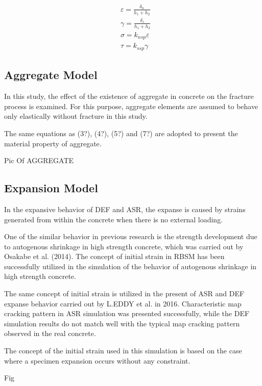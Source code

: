 \begin{equation}
  \begin{aligned}
   &\varepsilon = \frac{\delta_n}{h_1+h_2} \\
   &\gamma = \frac{\delta_s}{h_1+h_2} \\
   &\sigma = k_{nsp}\varepsilon \\
   &\tau = k_{ssp}\gamma
  \end{aligned}
\end{equation}

\subsection{Aggregate Model}

In this study, the effect of the existence of aggregate in
concrete on the fracture process is examined. For this
purpose, aggregate elements are assumed to behave only
elastically without fracture in this study.

The same equations as (3?), (4?), (5?) and (7?) are adopted to present the material property of aggregate.

Pic Of AGGREGATE

\subsection{Expansion Model}

In the expansive behavior of DEF and ASR, the expanse is caused by strains generated from within the concrete when there is no external loading.

One of the similar behavior in previous research is the strength development due to autogenous shrinkage in high strength concrete, which was carried out by Osakabe et al. (2014). The concept of initial strain in RBSM has been successfully utilized in the simulation of the behavior of autogenous shrinkage in high strength concrete.

The same concept of initial strain is utilized in the present of ASR and DEF expanse behavior carried out by L.EDDY et al. in 2016. Characteristic map cracking pattern in ASR simulation was presented successfully, while the DEF simulation results do not match well with the typical map cracking pattern observed in the real concrete.

The concept of the initial strain used in this simulation is based on the case where a specimen expansion occurs without any constraint.

Fig

